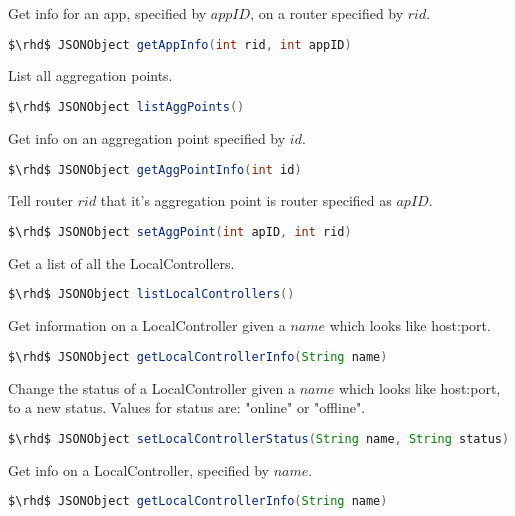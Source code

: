 \noindent  Get info for an app, specified by $appID$, on a router specified by $rid$.

\begin{lstlisting}[language=Java]
    $\rhd$ JSONObject getAppInfo(int rid, int appID)
\end{lstlisting}

\noindent  List all aggregation points.

\begin{lstlisting}[language=Java]
    $\rhd$ JSONObject listAggPoints()
\end{lstlisting}

\noindent  Get info on an aggregation point specified by $id$.

\begin{lstlisting}[language=Java]
    $\rhd$ JSONObject getAggPointInfo(int id)
\end{lstlisting}

\noindent  Tell router $rid$ that it's aggregation point is router
specified as $apID$.

\begin{lstlisting}[language=Java]
    $\rhd$ JSONObject setAggPoint(int apID, int rid)
\end{lstlisting}

\noindent  Get a list of all the LocalControllers.

\begin{lstlisting}[language=Java]
    $\rhd$ JSONObject listLocalControllers()
\end{lstlisting}

\noindent Get information on a LocalController given a $name$ which
looks like host:port.

\begin{lstlisting}[language=Java]
    $\rhd$ JSONObject getLocalControllerInfo(String name)
\end{lstlisting}

\noindent  Change the status of a LocalController given a $name$ which
looks like host:port, to a new status. Values for status are: "online"
or  "offline".

\begin{lstlisting}[language=Java]
    $\rhd$ JSONObject setLocalControllerStatus(String name, String status)
\end{lstlisting}

\noindent  Get info on a LocalController, specified by $name$.

\begin{lstlisting}[language=Java]
    $\rhd$ JSONObject getLocalControllerInfo(String name)
\end{lstlisting}

